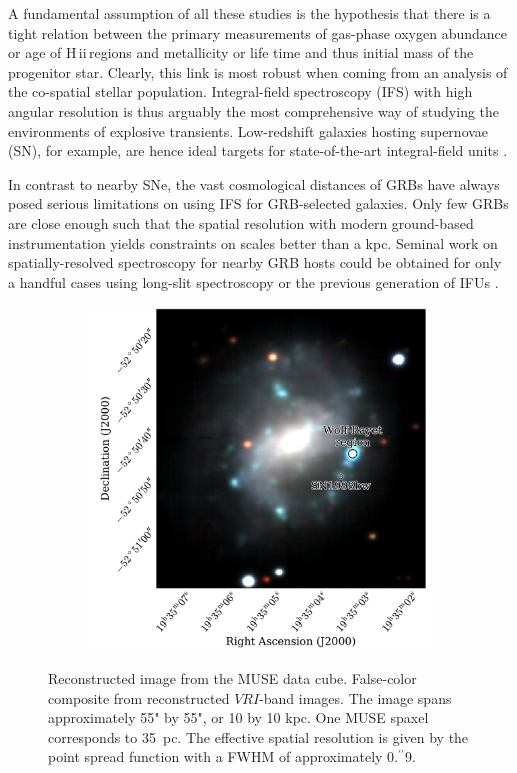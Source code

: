 \documentclass[traditabstract]{aa}
\newcommand{\farc}{\hbox{$.\!\!^{\prime\prime}$}}
\newcommand{\hii}{\mbox{H\,{\sc ii}}}
\begin{document}
A fundamental assumption of all these studies is the hypothesis that there is a tight relation between the primary measurements of gas-phase oxygen abundance or age of \hii\,regions and metallicity or life time and thus initial mass of the progenitor star. Clearly, this link is most robust when coming from an analysis of the co-spatial stellar population. Integral-field spectroscopy (IFS) with high angular resolution is thus arguably the most comprehensive way of studying the environments of explosive transients. Low-redshift galaxies hosting supernovae (SN), for example, are hence ideal targets for state-of-the-art integral-field units \citep[IFUs, e.g.][]{2013AJ....146...30K, 2014A&A...572A..38G}.

In contrast to nearby SNe, the vast cosmological distances of GRBs \citep[e.g.][]{2009ApJS..185..526F, 2009Natur.461.1254T, 2015A&A...581A.125K} have always posed serious limitations on using IFS for GRB-selected galaxies. Only few GRBs are close enough such that the spatial resolution with modern ground-based instrumentation yields constraints on scales better than a kpc. Seminal work on spatially-resolved spectroscopy for nearby GRB hosts could be obtained for only a handful cases using long-slit spectroscopy \citep[e.g.][]{2008ApJ...676.1151T, 2011ApJ...739...23L, 2015A&A...579A.126S} or the previous generation of IFUs \citep{2008A&A...490...45C, 2014MNRAS.441.2034T}. 

\begin{figure}
\begin{subfigure}{.47\textwidth}
  \includegraphics[width=0.999\linewidth]{Figs/MUSE_SN1998bw_RGB.pdf}
\end{subfigure}
\caption{Reconstructed image from the MUSE data cube. False-color composite from reconstructed $VRI$-band images. The image spans approximately 55" by 55", or 10 by 10 kpc. One MUSE spaxel corresponds to 35~pc. The effective spatial resolution is given by the point spread function with a FWHM of approximately 0\farc{9}.}
\label{fig:Host}
\end{figure}
\end{document}
